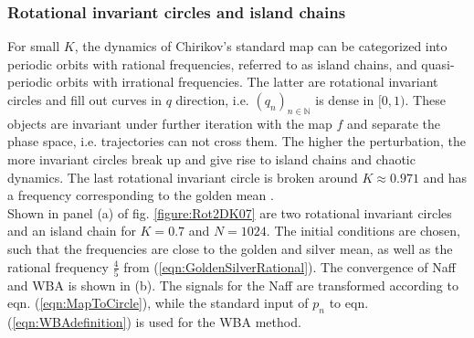 \subsubsection{Rotational invariant circles and island chains}
For small $K$, the dynamics of Chirikov's standard map can be categorized into periodic orbits with rational frequencies, referred to as island chains, and quasi-periodic orbits with irrational frequencies. 
The latter are rotational invariant circles and fill out curves in $q$ direction, i.e. $(q_n)_{n\in\mathbb{N}}$ is dense in $[0,1)$. 
These objects are invariant under further iteration with the map $f$ and separate the phase space, i.e. trajectories can not cross them.
The higher the perturbation, the more invariant circles break up and give rise to island chains and chaotic dynamics. 
The last rotational invariant circle is broken around $K\approx 0.971$ and has a frequency corresponding to the golden mean \cite{Gre1979}.
\\
Shown in panel (a) of fig. \ref{figure:Rot2DK07} are two rotational invariant circles and an island chain for $K=0.7$ and $N=1024$. 
The initial conditions are chosen, such that the frequencies are close to the golden and silver mean, as well as the rational frequency $\frac{4}{5}$ from (\ref{eqn:GoldenSilverRational}). 
The convergence of Naff and WBA is shown in (b). 
The signals for the Naff are transformed according to eqn. (\ref{eqn:MapToCircle}), while the standard input of $p_n$ to eqn. (\ref{eqn:WBAdefinition}) is used for the WBA method.

